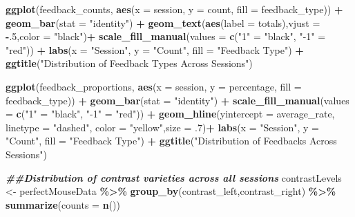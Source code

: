 \documentclass[
]{article}
\newenvironment{Shaded}{\begin{snugshade}}{\end{snugshade}}
\newcommand{\AttributeTok}[1]{\textcolor[rgb]{0.13,0.29,0.53}{#1}}
\newcommand{\DecValTok}[1]{\textcolor[rgb]{0.00,0.00,0.81}{#1}}
\newcommand{\DocumentationTok}[1]{\textcolor[rgb]{0.56,0.35,0.01}{\textbf{\textit{#1}}}}
\newcommand{\FunctionTok}[1]{\textcolor[rgb]{0.13,0.29,0.53}{\textbf{#1}}}
\newcommand{\NormalTok}[1]{#1}
\newcommand{\OtherTok}[1]{\textcolor[rgb]{0.56,0.35,0.01}{#1}}
\newcommand{\SpecialCharTok}[1]{\textcolor[rgb]{0.81,0.36,0.00}{\textbf{#1}}}
\newcommand{\StringTok}[1]{\textcolor[rgb]{0.31,0.60,0.02}{#1}}
\begin{document}
\begin{Shaded}
\begin{Highlighting}[]
\FunctionTok{ggplot}\NormalTok{(feedback\_counts, }\FunctionTok{aes}\NormalTok{(}\AttributeTok{x =}\NormalTok{ session, }\AttributeTok{y =}\NormalTok{ count, }\AttributeTok{fill =}\NormalTok{ feedback\_type)) }\SpecialCharTok{+}
  \FunctionTok{geom\_bar}\NormalTok{(}\AttributeTok{stat =} \StringTok{"identity"}\NormalTok{) }\SpecialCharTok{+} \FunctionTok{geom\_text}\NormalTok{(}\FunctionTok{aes}\NormalTok{(}\AttributeTok{label =}\NormalTok{ totals),}\AttributeTok{vjust =} \SpecialCharTok{{-}}\NormalTok{.}\DecValTok{5}\NormalTok{,}\AttributeTok{color =} \StringTok{"black"}\NormalTok{)}\SpecialCharTok{+} \FunctionTok{scale\_fill\_manual}\NormalTok{(}\AttributeTok{values =} \FunctionTok{c}\NormalTok{(}\StringTok{"1"} \OtherTok{=} \StringTok{"black"}\NormalTok{, }\StringTok{"{-}1"} \OtherTok{=} \StringTok{"red"}\NormalTok{)) }\SpecialCharTok{+} \FunctionTok{labs}\NormalTok{(}\AttributeTok{x =} \StringTok{"Session"}\NormalTok{, }\AttributeTok{y =} \StringTok{"Count"}\NormalTok{, }\AttributeTok{fill =} \StringTok{"Feedback Type"}\NormalTok{) }\SpecialCharTok{+} \FunctionTok{ggtitle}\NormalTok{(}\StringTok{"Distribution of Feedback Types Across Sessions"}\NormalTok{)}



\FunctionTok{ggplot}\NormalTok{(feedback\_proportions, }\FunctionTok{aes}\NormalTok{(}\AttributeTok{x =}\NormalTok{ session, }\AttributeTok{y =}\NormalTok{ percentage, }\AttributeTok{fill =}\NormalTok{ feedback\_type)) }\SpecialCharTok{+}
  \FunctionTok{geom\_bar}\NormalTok{(}\AttributeTok{stat =} \StringTok{"identity"}\NormalTok{) }\SpecialCharTok{+}
  \FunctionTok{scale\_fill\_manual}\NormalTok{(}\AttributeTok{values =} \FunctionTok{c}\NormalTok{(}\StringTok{"1"} \OtherTok{=} \StringTok{"black"}\NormalTok{, }\StringTok{"{-}1"} \OtherTok{=} \StringTok{"red"}\NormalTok{)) }\SpecialCharTok{+} \FunctionTok{geom\_hline}\NormalTok{(}\AttributeTok{yintercept =}\NormalTok{ average\_rate, }\AttributeTok{linetype =} \StringTok{"dashed"}\NormalTok{, }\AttributeTok{color =} \StringTok{"yellow"}\NormalTok{,}\AttributeTok{size =}\NormalTok{ .}\DecValTok{7}\NormalTok{)}\SpecialCharTok{+}
  \FunctionTok{labs}\NormalTok{(}\AttributeTok{x =} \StringTok{"Session"}\NormalTok{, }\AttributeTok{y =} \StringTok{"Count"}\NormalTok{, }\AttributeTok{fill =} \StringTok{"Feedback Type"}\NormalTok{) }\SpecialCharTok{+}
  \FunctionTok{ggtitle}\NormalTok{(}\StringTok{"Distribution of Feedbacks Across Sessions"}\NormalTok{)}




\DocumentationTok{\#\#Distribution of contrast varieties across all sessions}
\NormalTok{contrastLevels }\OtherTok{\textless{}{-}}\NormalTok{  perfectMouseData }\SpecialCharTok{\%\textgreater{}\%} \FunctionTok{group\_by}\NormalTok{(contrast\_left,contrast\_right) }\SpecialCharTok{\%\textgreater{}\%} \FunctionTok{summarize}\NormalTok{(}\AttributeTok{counts =} \FunctionTok{n}\NormalTok{()) }



\end{Highlighting}
\end{Shaded}
\end{document}
